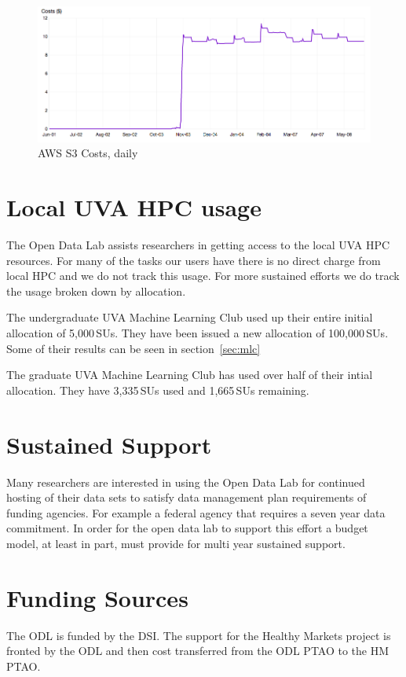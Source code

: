 \begin{figure}[!hbtp]
\includegraphics[width=\textwidth]{images/aws-metrics/s3-cost-daily.png}
\caption{AWS S3 Costs, daily\label{fg:awstotal}}
\end{figure}


\section{Local UVA HPC usage}
The Open Data Lab assists researchers in getting access to the local UVA HPC resources. For many of the tasks our users have there is no direct charge from local HPC and we do not track this usage. For more sustained efforts we do track the usage broken down by allocation.

The undergraduate UVA Machine Learning Club used up their entire initial allocation of 5,000\,SUs. They have been issued a new allocation of 100,000\,SUs. Some of their results can be seen in section~\ref{sec:mlc}

The graduate UVA Machine Learning Club has used over half of their intial allocation. They have 3,335\,SUs used and 1,665\,SUs remaining.

\section{Sustained Support}
Many researchers are interested in using the Open Data Lab for continued hosting of their data sets to satisfy data management plan requirements of funding agencies. For example a federal agency that requires a seven year data commitment. In order for the open data lab to support this effort a budget model, at least in part, must provide for multi year sustained support.

\section{Funding Sources}
The ODL is funded by the DSI. The support for the Healthy Markets project is fronted by the ODL and then  cost transferred from the ODL PTAO to the HM PTAO.











